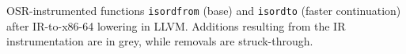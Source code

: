 \label{fig:osr-isordx86_64} OSR-instrumented functions {\tt isordfrom} (base) and {\tt isordto} (faster continuation) after IR-to-x86-64 lowering in LLVM. %
Additions resulting from the IR instrumentation are in grey, while removals are struck-through.

